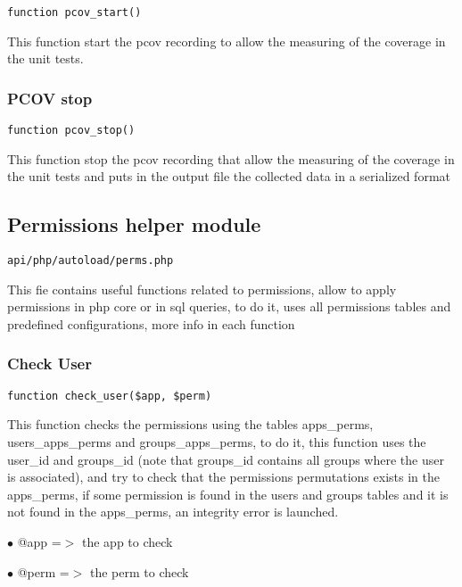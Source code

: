 \documentclass[a4paper]{article}
\begin{document}
\begin{lstlisting}
function pcov_start()
\end{lstlisting}

This function start the pcov recording to allow the measuring of the
coverage in the unit tests.

\hypertarget{toc188}{}
\subsubsection{PCOV stop}

\begin{lstlisting}
function pcov_stop()
\end{lstlisting}

This function stop the pcov recording that allow the measuring of the
coverage in the unit tests and puts in the output file the collected
data in a serialized format

\hypertarget{toc189}{}
\subsection{Permissions helper module}

\begin{lstlisting}
api/php/autoload/perms.php
\end{lstlisting}

This fie contains useful functions related to permissions, allow to apply permissions in php core
or in sql queries, to do it, uses all permissions tables and predefined configurations, more info
in each function

\hypertarget{toc190}{}
\subsubsection{Check User}

\begin{lstlisting}
function check_user($app, $perm)
\end{lstlisting}

This function checks the permissions using the tables apps\_perms,
users\_apps\_perms and groups\_apps\_perms, to do it, this function uses
the user\_id and groups\_id (note that groups\_id contains all groups
where the user is associated), and try to check that the permissions
permutations exists in the apps\_perms, if some permission is found
in the users and groups tables and it is not found in the apps\_perms,
an integrity error is launched.

\begin{compactitem}
\item[\color{myblue}$\bullet$] @app  =$>$ the app to check
\item[\color{myblue}$\bullet$] @perm =$>$ the perm to check
\end{compactitem}
\end{document}
